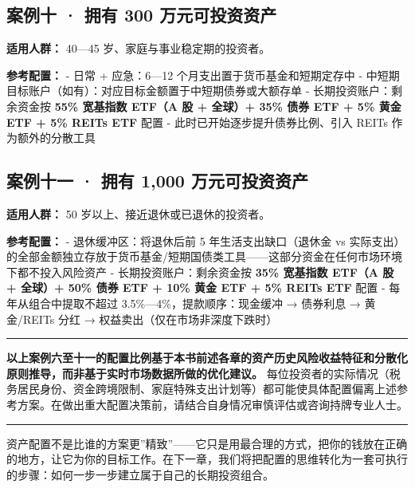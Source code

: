 \documentclass[a4paper,11pt,oneside,fontset=none,UTF8,zihao=-4]{ctexbook}
\begin{document}
\subsection{案例十 · 拥有 300
万元可投资资产}\label{ux6848ux4f8bux5341-ux62e5ux6709-300-ux4e07ux5143ux53efux6295ux8d44ux8d44ux4ea7}

\textbf{适用人群：} 40---45 岁、家庭与事业稳定期的投资者。

\textbf{参考配置：} - 日常 + 应急：6---12
个月支出置于货币基金和短期定存中 -
中短期目标账户（如有）：对应目标金额置于中短期债券或大额存单 -
长期投资账户：剩余资金按 \textbf{55\% 宽基指数 ETF（A 股 + 全球）+ 35\%
债券 ETF + 5\% 黄金 ETF + 5\% REITs ETF} 配置 -
此时已开始逐步提升债券比例、引入 REITs 作为额外的分散工具

\subsection{案例十一 · 拥有 1,000
万元可投资资产}\label{ux6848ux4f8bux5341ux4e00-ux62e5ux6709-1000-ux4e07ux5143ux53efux6295ux8d44ux8d44ux4ea7}

\textbf{适用人群：} 50 岁以上、接近退休或已退休的投资者。

\textbf{参考配置：} - 退休缓冲区：将退休后前 5 年生活支出缺口（退休金 vs
实际支出）的全部金额独立存放于货币基金/短期国债类工具------这部分资金在任何市场环境下都不投入风险资产
- 长期投资账户：剩余资金按 \textbf{35\% 宽基指数 ETF（A 股 + 全球）+
50\% 债券 ETF + 10\% 黄金 ETF + 5\% REITs ETF} 配置 -
每年从组合中提取不超过 3.5\%---4\%，提款顺序：现金缓冲 → 债券利息 →
黄金/REITs 分红 → 权益卖出（仅在市场非深度下跌时）

\begin{center}{\color{dh-bronze}\rule{0.2\textwidth}{0.5pt}}\end{center}

\begin{dhquote}
\textbf{以上案例六至十一的配置比例基于本书前述各章的资产历史风险收益特征和分散化原则推导，而非基于实时市场数据所做的优化建议。}
每位投资者的实际情况（税务居民身份、资金跨境限制、家庭特殊支出计划等）都可能使具体配置偏离上述参考方案。在做出重大配置决策前，请结合自身情况审慎评估或咨询持牌专业人士。
\end{dhquote}

\begin{center}{\color{dh-bronze}\rule{0.2\textwidth}{0.5pt}}\end{center}

资产配置不是比谁的方案更''精致''------它只是用最合理的方式，把你的钱放在正确的地方，让它为你的目标工作。在下一章，我们将把配置的思维转化为一套可执行的步骤：如何一步一步建立属于自己的长期投资组合。
\end{document}
